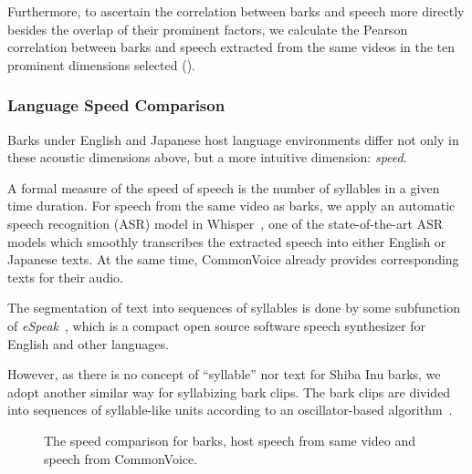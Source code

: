 Furthermore, to ascertain the correlation between barks and speech more directly 
besides the overlap of their prominent factors, we calculate the Pearson correlation 
between barks and speech extracted from the same videos in the ten prominent dimensions 
selected (). 

\subsubsection{Language Speed Comparison}
\label{sec:prominentfactor1}
Barks under English and Japanese host language environments differ not only in these 
acoustic dimensions above, but a more intuitive dimension: \textit{speed}.

A formal measure of the speed of speech is the number of syllables in 
a given time duration. For speech from the same video as barks, we apply an automatic speech 
recognition (ASR) model in Whisper~\cite{radford2022robust}, one of the state-of-the-art ASR models 
which smoothly transcribes the extracted speech into either English or Japanese texts. 
At the same time, CommonVoice already provides corresponding texts for their audio.

The segmentation of text into sequences of syllables is done by some subfunction of 
\textit{eSpeak}~\cite{duddington2012espeak}, which is a compact open source software speech synthesizer for 
English and other languages.

However, as there is no concept of ``syllable'' nor text for Shiba Inu barks, 
we adopt another similar way for syllabizing bark clips. The bark clips are divided into 
sequences of syllable-like units according to an oscillator-based 
algorithm~\cite{rasanen2018pre}.
\begin{figure}[th]
	\centering
	\caption{The speed comparison for barks, host speech from same video and speech from CommonVoice.}
	\label{fig:speedcomparison}
\end{figure}

